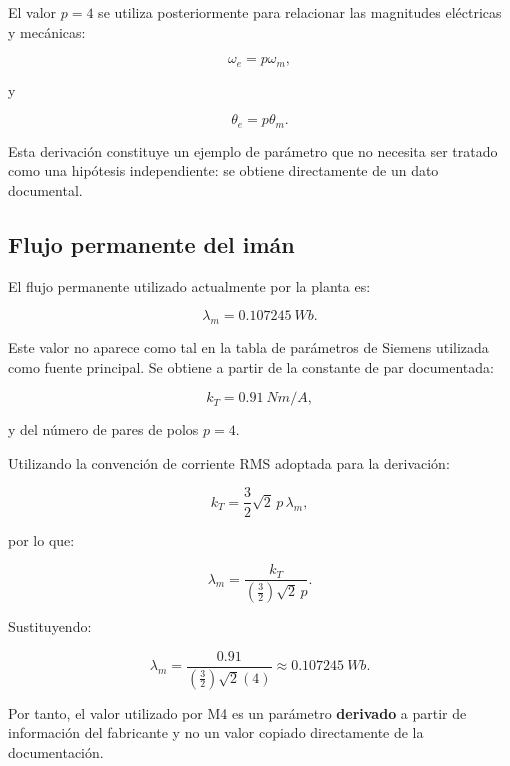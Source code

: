 El valor $p=4$ se utiliza posteriormente para relacionar las magnitudes eléctricas y mecánicas:

\begin{equation}
\omega_e=p\omega_m,
\end{equation}

y

\begin{equation}
\theta_e=p\theta_m.
\end{equation}

Esta derivación constituye un ejemplo de parámetro que no necesita ser tratado como una hipótesis independiente: se obtiene directamente de un dato documental.

\subsection{Flujo permanente del imán}

El flujo permanente utilizado actualmente por la planta es:

\begin{equation}
\lambda_m=\SI{0.107245}{Wb}.
\end{equation}

Este valor no aparece como tal en la tabla de parámetros de Siemens utilizada como fuente principal. Se obtiene a partir de la constante de par documentada:

\begin{equation}
k_T=\SI{0.91}{Nm/A},
\end{equation}

y del número de pares de polos $p=4$.

Utilizando la convención de corriente RMS adoptada para la derivación:

\begin{equation}
k_T=
\frac{3}{2}\sqrt{2}\,p\,\lambda_m,
\end{equation}

por lo que:

\begin{equation}
\lambda_m=
\frac{k_T}
{\left(\frac{3}{2}\right)\sqrt{2}\,p}.
\end{equation}

Sustituyendo:

\begin{equation}
\lambda_m=
\frac{0.91}
{\left(\frac{3}{2}\right)\sqrt{2}(4)}
\approx
\SI{0.107245}{Wb}.
\end{equation}

Por tanto, el valor utilizado por M4 es un parámetro \textbf{derivado} a partir de información del fabricante y no un valor copiado directamente de la documentación.

